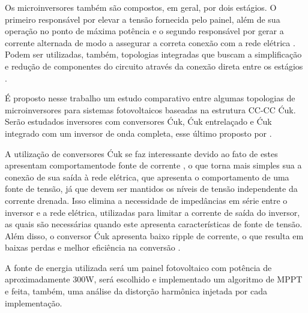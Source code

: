 \documentclass[
	12pt,				%
	openright,			%
	onseside,
	a4paper,			%
	english,			%
	french,				%
	spanish,			%
	brazil,				%
	]{abntex2}
\begin{document}
	Os microinversores também são compostos, em geral, por dois estágios. O primeiro responsável por elevar a tensão fornecida pelo painel, além de sua operação no ponto de máxima potência e o segundo responsável por gerar a corrente alternada de modo a assegurar a correta conexão com a rede elétrica \cite{Nezamuddin_des_eff_micro}. Podem ser utilizadas, também, topologias integradas que buscam a simplificação e redução de componentes do circuito através da conexão direta entre os estágios \cite{LUIGI_int_top} \cite{LUIGIJUNIOR_ev_int}.

	
	É proposto nesse trabalho um estudo comparativo entre algumas topologias de microinversores para sistemas fotovoltaicos baseadas na estrutura CC-CC Ćuk. Serão estudados inversores com conversores Ćuk, Ćuk entrelaçado e Ćuk integrado com um inversor de onda completa, esse último proposto por \cite{LUIGI_int_top}.

	A utilização de conversores Ćuk se faz interessante devido ao fato de estes apresentam comportamentode fonte de corrente \cite{LUIGIJUNIOR_ev_int}, o que torna mais simples sua a conexão de sua saída à rede elétrica, que apresenta o comportamento de uma fonte de tensão, já que devem ser mantidos os níveis de tensão independente da corrente drenada. Isso elimina a necessidade de impedâncias em série entre o inversor e a rede elétrica, utilizadas para limitar a corrente de saída do inversor, as quais são necessárias quando este apresenta características de fonte de tensão. Além disso, o conversor Ćuk apresenta baixo ripple de corrente, o que resulta em baixas perdas e melhor eficiência na conversão \cite{Shawky_perform_anal}.



	A fonte de energia utilizada será um painel fotovoltaico com potência de aproximadamente 300W, será escolhido e implementado um algoritmo de MPPT e feita, também,  uma análise da distorção harmônica injetada por cada implementação.
%
%
%
\end{document}
